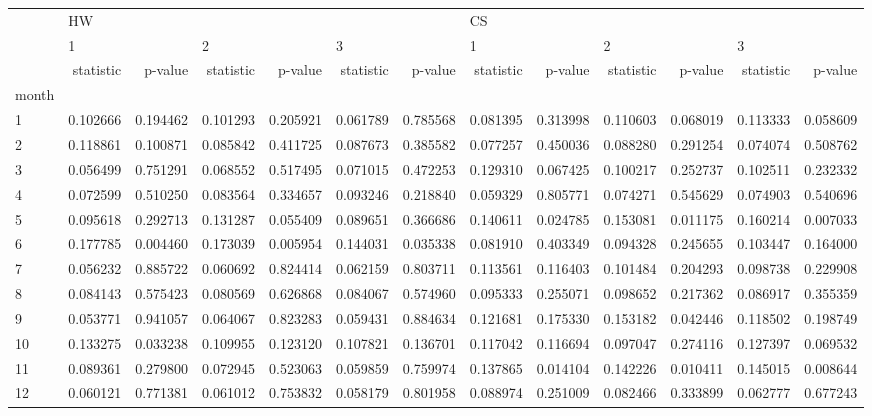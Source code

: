 \begin{tabular}{lrrrrrrrrrrrr}
\toprule
{} & \multicolumn{6}{l}{HW} & \multicolumn{6}{l}{CS} \\
{} & \multicolumn{2}{l}{1} & \multicolumn{2}{l}{2} & \multicolumn{2}{l}{3} & \multicolumn{2}{l}{1} & \multicolumn{2}{l}{2} & \multicolumn{2}{l}{3} \\
{} & statistic &   p-value & statistic &   p-value & statistic &   p-value & statistic &   p-value & statistic &   p-value & statistic &   p-value \\
month &           &           &           &           &           &           &           &           &           &           &           &           \\
\midrule
1     &  0.102666 &  0.194462 &  0.101293 &  0.205921 &  0.061789 &  0.785568 &  0.081395 &  0.313998 &  0.110603 &  0.068019 &  0.113333 &  0.058609 \\
2     &  0.118861 &  0.100871 &  0.085842 &  0.411725 &  0.087673 &  0.385582 &  0.077257 &  0.450036 &  0.088280 &  0.291254 &  0.074074 &  0.508762 \\
3     &  0.056499 &  0.751291 &  0.068552 &  0.517495 &  0.071015 &  0.472253 &  0.129310 &  0.067425 &  0.100217 &  0.252737 &  0.102511 &  0.232332 \\
4     &  0.072599 &  0.510250 &  0.083564 &  0.334657 &  0.093246 &  0.218840 &  0.059329 &  0.805771 &  0.074271 &  0.545629 &  0.074903 &  0.540696 \\
5     &  0.095618 &  0.292713 &  0.131287 &  0.055409 &  0.089651 &  0.366686 &  0.140611 &  0.024785 &  0.153081 &  0.011175 &  0.160214 &  0.007033 \\
6     &  0.177785 &  0.004460 &  0.173039 &  0.005954 &  0.144031 &  0.035338 &  0.081910 &  0.403349 &  0.094328 &  0.245655 &  0.103447 &  0.164000 \\
7     &  0.056232 &  0.885722 &  0.060692 &  0.824414 &  0.062159 &  0.803711 &  0.113561 &  0.116403 &  0.101484 &  0.204293 &  0.098738 &  0.229908 \\
8     &  0.084143 &  0.575423 &  0.080569 &  0.626868 &  0.084067 &  0.574960 &  0.095333 &  0.255071 &  0.098652 &  0.217362 &  0.086917 &  0.355359 \\
9     &  0.053771 &  0.941057 &  0.064067 &  0.823283 &  0.059431 &  0.884634 &  0.121681 &  0.175330 &  0.153182 &  0.042446 &  0.118502 &  0.198749 \\
10    &  0.133275 &  0.033238 &  0.109955 &  0.123120 &  0.107821 &  0.136701 &  0.117042 &  0.116694 &  0.097047 &  0.274116 &  0.127397 &  0.069532 \\
11    &  0.089361 &  0.279800 &  0.072945 &  0.523063 &  0.059859 &  0.759974 &  0.137865 &  0.014104 &  0.142226 &  0.010411 &  0.145015 &  0.008644 \\
12    &  0.060121 &  0.771381 &  0.061012 &  0.753832 &  0.058179 &  0.801958 &  0.088974 &  0.251009 &  0.082466 &  0.333899 &  0.062777 &  0.677243 \\
\bottomrule
\end{tabular}
